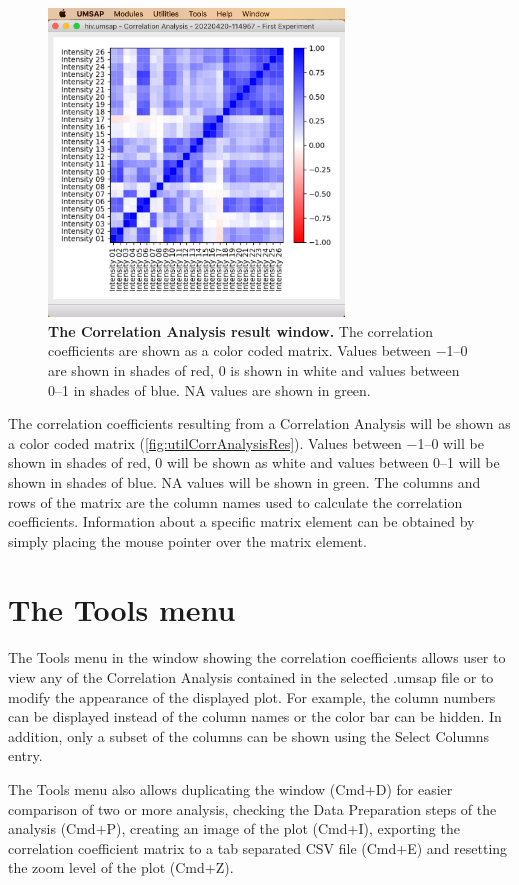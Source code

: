 \begin{figure}[h]
    \centering
    \includegraphics[width=0.7\textwidth]{./IMAGES/UTIL-CORR-WINDOW/util-corr-res.jpg}
    \caption[The Correlation Analysis result window]{\textbf{The Correlation Analysis
    result window.} The correlation coefficients are shown as a color coded matrix.
    Values between \numrange{-1}{0} are shown in shades of red, \num{0} is shown in
    white and values between \numrange{0}{1} in shades of blue. NA values are shown
    in green.}
    \label{fig:utilCorrAnalysisRes}
    \vspace{-5pt} 	
\end{figure} 

The correlation coefficients resulting from a Correlation Analysis will be shown
as a color coded matrix (\autoref{fig:utilCorrAnalysisRes}). Values between \numrange{-1}{0}
will be shown in shades of red, \num{0} will be shown as white and values between
\numrange{0}{1} will be shown in shades of blue. NA values will be shown in green.
The columns and rows of the matrix are the column names used to calculate the correlation
coefficients. Information about a specific matrix element can be obtained by simply
placing the mouse pointer over the matrix element.

\section{The Tools menu}

The Tools menu in the window showing the correlation coefficients allows user to
view any of the Correlation Analysis contained in the selected .umsap file or to
modify the appearance of the displayed plot. For example, the column numbers can
be displayed instead of the column names or the color bar can be hidden. In addition,
only a subset of the columns can be shown using the Select Columns entry.

The Tools menu also allows duplicating the window (Cmd+D) for easier comparison of
two or more analysis, checking the Data Preparation steps of the analysis (Cmd+P),
creating an image of the plot (Cmd+I), exporting the correlation coefficient matrix
to a tab separated CSV file (Cmd+E) and resetting the zoom level of the plot (Cmd+Z).

